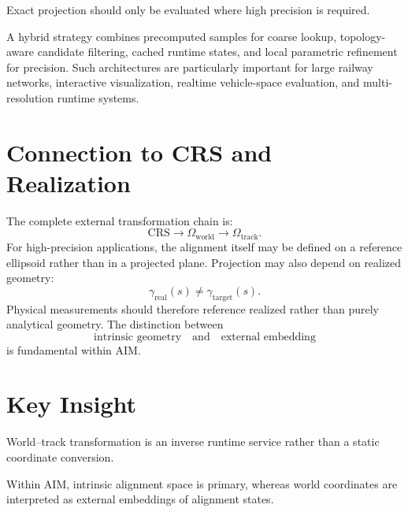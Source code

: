 \begin{proposition}
\label{prop:selective-projection}
Exact projection should only be evaluated where high precision is
required.
\end{proposition}

A hybrid strategy combines precomputed samples for coarse lookup,
topology-aware candidate filtering, cached runtime states, and local
parametric refinement for precision. Such architectures are
particularly important for large railway networks, interactive
visualization, realtime vehicle-space evaluation, and multi-resolution
runtime systems.

\section{Connection to CRS and Realization}

The complete external transformation chain is:
\[
\text{CRS}
\rightarrow
\Omega_{\mathrm{world}}
\rightarrow
\Omega_{\mathrm{track}}.
\]
For high-precision applications, the alignment itself may be defined on
a reference ellipsoid rather than in a projected plane. Projection may
also depend on realized geometry:
\[
\gamma_{\mathrm{real}}(s)
\neq
\gamma_{\mathrm{target}}(s).
\]
Physical measurements should therefore reference realized rather than
purely analytical geometry. The distinction between
\[
\text{intrinsic geometry}
\quad\text{and}\quad
\text{external embedding}
\]
is fundamental within AIM.

\section{Key Insight}

\begin{proposition}
World--track transformation is an inverse runtime service rather than a
static coordinate conversion.
\end{proposition}

\begin{proposition}
Within AIM, intrinsic alignment space is primary, whereas world
coordinates are interpreted as external embeddings of alignment states.
\end{proposition}

